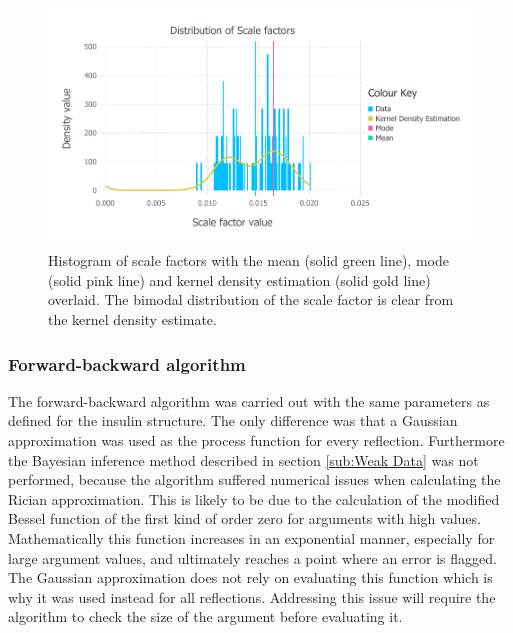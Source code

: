 \begin{figure}[ht!]
    \centering
    \includegraphics[width=1.0\textwidth]{figures/datared/ScaleFac_Distribution_cprot.pdf}
    \caption[Histogram of scale factors for the C.Esp1396I dataset.]{Histogram of scale factors with the mean (solid green line), mode (solid pink line) and kernel density estimation (solid gold line) overlaid.
    The bimodal distribution of the scale factor is clear from the kernel density estimate.}
    \label{fig:Scale factor distribution after outlier removal - C.Esp1396I}
\end{figure}

\subsubsection{Forward-backward algorithm}
\label{subs:Forward-backward algorithm - C.Esp1396I}
The forward-backward algorithm was carried out with the same parameters as defined for the insulin structure.
The only difference was that a Gaussian approximation was used as the process function for every reflection.
Furthermore the Bayesian inference method described in section \ref{sub:Weak Data} was not performed, because the algorithm suffered numerical issues when calculating the Rician approximation.
This is likely to be due to the calculation of the modified Bessel function of the first kind of order zero for arguments with high values.
Mathematically this function increases in an exponential manner, especially for large argument values, and ultimately reaches a point where an error is flagged.
The Gaussian approximation does not rely on evaluating this function which is why it was used instead for all reflections.
Addressing this issue will require the algorithm to check the size of the argument before evaluating it.

